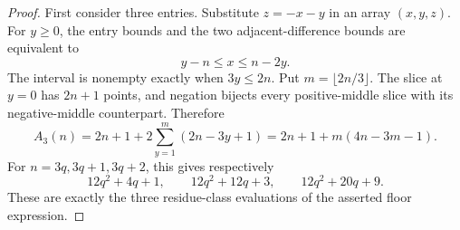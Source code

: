 \begin{proof}
First consider three entries. Substitute $z=-x-y$ in an array
$(x,y,z)$. For $y\ge0$, the entry bounds and the two adjacent-difference
bounds are equivalent to
\[
 y-n\le x\le n-2y.
\]
The interval is nonempty exactly when $3y\le2n$. Put
$m=\lfloor2n/3\rfloor$. The slice at $y=0$ has $2n+1$ points, and
negation bijects every positive-middle slice with its negative-middle
counterpart. Therefore
\begin{equation}\label{eq:three-slices}
 A_3(n)=2n+1+2\sum_{y=1}^{m}(2n-3y+1)
       =2n+1+m(4n-3m-1).
\end{equation}
For $n=3q,3q+1,3q+2$, this gives respectively
\[
 12q^2+4q+1,\qquad12q^2+12q+3,\qquad12q^2+20q+9.
\]
These are exactly the three residue-class evaluations of the asserted
floor expression.


\end{proof}
